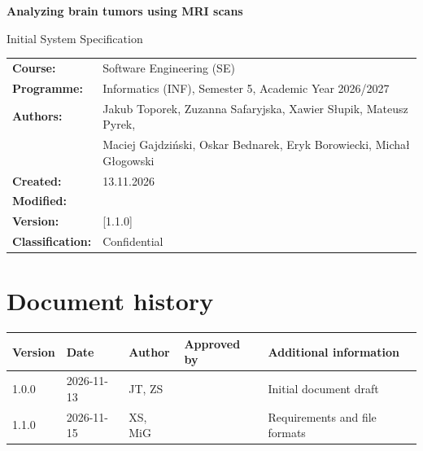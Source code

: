 \documentclass[11pt, a4paper]{article}
\begin{document}
\begin{titlepage}
    \centering
    \vspace*{2cm}

    {\LARGE \bfseries Analyzing brain tumors using MRI scans \par}
    \vspace{0.5cm}
    {\Large Initial System Specification \par}

    \vspace{2cm}

    \begin{tabularx}{\textwidth}{@{} >{\bfseries}l X @{}}
        Course:         & Software Engineering (SE)                                            \\
        Programme:      & Informatics (INF), Semester 5, Academic Year 2026/2027               \\
        Authors:        & Jakub Toporek, Zuzanna Safaryjska, Xawier Słupik, Mateusz Pyrek,     \\
                        & Maciej Gajdziński, Oskar Bednarek, Eryk Borowiecki, Michał Głogowski \\
        Created:        & 13.11.2026                                                           \\
        Modified:       &                                                                      \\
        Version:        & {[1.1.0]}                                                            \\
        Classification: & Confidential                                                         \\
    \end{tabularx}

    \vfill
\end{titlepage}

\tableofcontents
\newpage

\section{Document history}

\noindent
\renewcommand{\arraystretch}{1.3}
\begin{tabularx}{\textwidth}{|l|l|l|l|X|}
    \hline
    \textbf{Version} & \textbf{Date} & \textbf{Author} & \textbf{Approved by} & \textbf{Additional information} \\
    \hline
    1.0.0            & 2026-11-13    & JT, ZS          &                      & Initial document draft          \\ \hline
    1.1.0            & 2026-11-15    & XS, MiG         &                      & Requirements and file formats   \\
    \hline
\end{tabularx}
\end{document}
